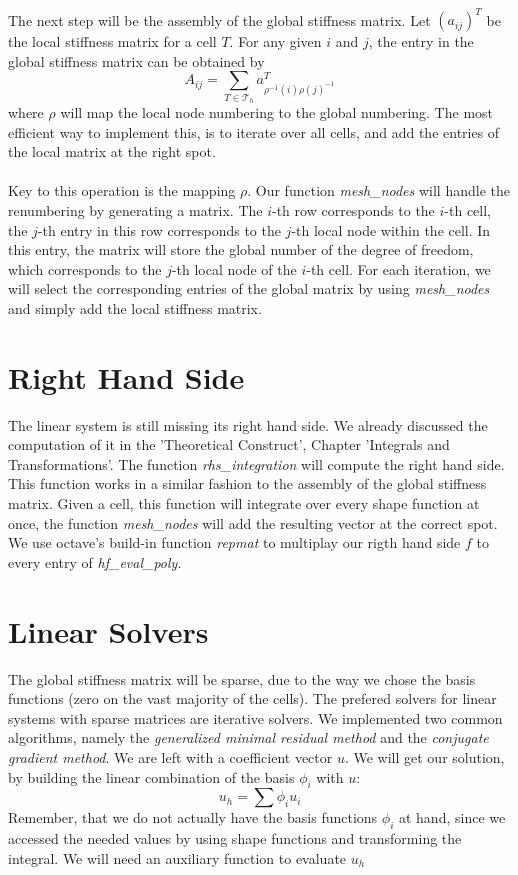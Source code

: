 \documentclass[a4paper,12pt]{article}
\begin{document}
\\
The next step will be the assembly of the global stiffness matrix.
Let $(a_{ij})^T$ be the local stiffness matrix for a cell $T$. For any given $i$ and $j$, the entry in the global stiffness matrix can be obtained by \[A_{ij}=\sum_{T \in \mathscr{T}_h}a_{\rho^{-1}(i)\rho(j)^{-1}}^T\] where $\rho$ will map the local node numbering to the global numbering. The most efficient way to implement this, is to iterate over all cells, and add the entries of the local matrix at the right spot.\\
\\
Key to this operation is the mapping $\rho$. Our function \textit{mesh\_nodes} will handle the renumbering by generating a matrix. The $i$-th row corresponds to the $i$-th cell, the $j$-th entry in this row corresponds to the $j$-th local node within the cell. In this entry, the matrix will store the global number of the degree of freedom, which corresponds to the $j$-th local node of the $i$-th cell. For each iteration, we will select the corresponding entries of the global matrix by using \textit{mesh\_nodes} and simply add the local stiffness matrix.

\section{Right Hand Side}
The linear system is still missing its right hand side. We already discussed the computation of it in the 'Theoretical Construct', Chapter 'Integrals and Transformations'. The function \textit{rhs\_integration} will compute the right hand side. \\
This function works in a similar fashion to the assembly of the global stiffness matrix. Given a cell, this function will integrate over every shape function at once, the function \textit{mesh\_nodes} will add the resulting vector at the correct spot. We use octave's build-in function \textit{repmat} to multiplay our rigth hand side $f$ to every entry of \textit{hf\_eval\_poly}. 
\section{Linear Solvers}
The global stiffness matrix will be sparse, due to the way we chose the basis functions (zero on the vast majority of the cells). The prefered solvers for linear systems with sparse matrices are iterative solvers. We implemented two common algorithms, namely the \textit{generalized minimal residual method} and the \textit{conjugate gradient method}. 
We are left with a coefficient vector $u$. We will get our solution, by building the linear combination of the basis ${\phi_i}$ with $u$: 
\[u_h = \sum \phi_i u_i\]
Remember, that we do not actually have the basis functions $\phi_i$ at hand, since we accessed the needed values by using shape functions and transforming the integral. We will need an auxiliary function to evaluate $u_h$
\end{document}
